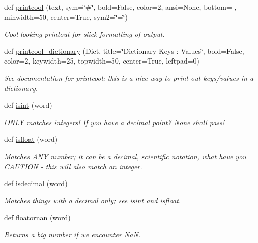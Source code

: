 \begin{DoxyCompactItemize}
def \hyperlink{namespacesrc_1_1nifty_a9bda70a78d0f5d31e10dfffaf85803c9}{printcool} (text, sym=\char`\"{}\#\char`\"{}, bold=False, color=2, ansi=None, bottom=\textquotesingle{}-\/\textquotesingle{}, minwidth=50, center=True, sym2=\char`\"{}=\char`\"{})
\begin{DoxyCompactList}\small\item\em Cool-\/looking printout for slick formatting of output. \end{DoxyCompactList}\item 
def \hyperlink{namespacesrc_1_1nifty_a78476d8a6da41a734762a4e44c339975}{printcool\+\_\+dictionary} (Dict, title=\char`\"{}Dictionary Keys \+: Values\char`\"{}, bold=False, color=2, keywidth=25, topwidth=50, center=True, leftpad=0)
\begin{DoxyCompactList}\small\item\em See documentation for printcool; this is a nice way to print out keys/values in a dictionary. \end{DoxyCompactList}\item 
def \hyperlink{namespacesrc_1_1nifty_a594046f5f131f78ae33a5930144f002b}{isint} (word)
\begin{DoxyCompactList}\small\item\em O\+N\+LY matches integers! If you have a decimal point? None shall pass! \end{DoxyCompactList}\item 
def \hyperlink{namespacesrc_1_1nifty_a1527eb932518ec1ac5b6e879c279bf24}{isfloat} (word)
\begin{DoxyCompactList}\small\item\em Matches A\+NY number; it can be a decimal, scientific notation, what have you C\+A\+U\+T\+I\+ON -\/ this will also match an integer. \end{DoxyCompactList}\item 
def \hyperlink{namespacesrc_1_1nifty_aa059dcefffa25bfd0085973b14cbefbb}{isdecimal} (word)
\begin{DoxyCompactList}\small\item\em Matches things with a decimal only; see isint and isfloat. \end{DoxyCompactList}\item 
def \hyperlink{namespacesrc_1_1nifty_a1adc158bdcdb57c642f95d5e015bc881}{floatornan} (word)
\begin{DoxyCompactList}\small\item\em Returns a big number if we encounter NaN. \end{DoxyCompactList}\item 

\end{DoxyCompactItemize}

